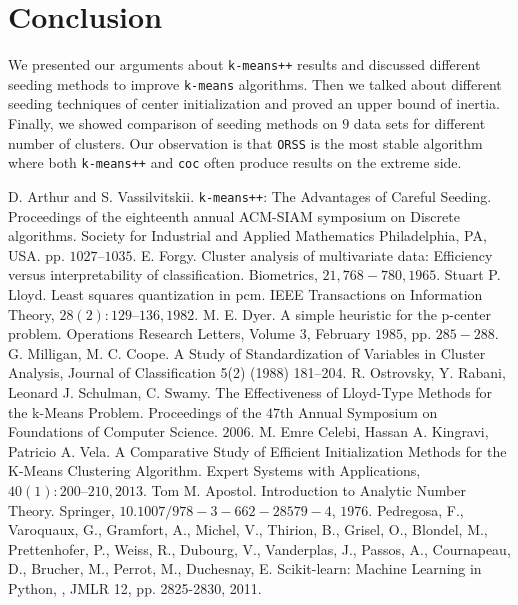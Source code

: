 \documentclass[twoside, 11pt]{article}
\begin{document}
	\section{Conclusion}
	We presented our arguments about \texttt{k-means++} results and discussed different seeding methods to improve \texttt{k-means} algorithms. Then we talked about different seeding techniques of center initialization and proved an upper bound of inertia. Finally, we showed comparison of seeding methods on $9$ data sets for different number of clusters. Our observation is that \texttt{ORSS} is the most stable algorithm where both \texttt{k-means++} and \texttt{coc} often produce results on the extreme side.
	\begin{thebibliography}{99}
		 D. Arthur and S. Vassilvitskii. \texttt{k-means++}: The Advantages of Careful Seeding. Proceedings of the eighteenth annual ACM-SIAM symposium on Discrete algorithms. Society for Industrial and Applied Mathematics Philadelphia, PA, USA. pp. $1027–1035$.
		 E. Forgy. Cluster analysis of multivariate data: Efficiency versus interpretability of classification. Biometrics, $21, 768-780, 1965$.
		 Stuart P. Lloyd. Least squares quantization in pcm. IEEE Transactions on Information Theory, $28(2):129–136, 1982$.
		 M. E. Dyer. A simple heuristic for the p-center problem. Operations Research Letters, Volume $3$, February $1985$, pp. $285-288$.
		 G. Milligan, M. C. Coope. A Study of Standardization of Variables in Cluster Analysis, Journal of Classification 5(2) (1988) 181–204.
		 R. Ostrovsky, Y. Rabani, Leonard J. Schulman, C. Swamy. The Effectiveness of Lloyd-Type Methods for the k-Means Problem. Proceedings of the $47$th Annual Symposium on Foundations of Computer Science. $2006$.
		 M. Emre Celebi, Hassan A. Kingravi, Patricio A. Vela. A Comparative Study of Efficient Initialization Methods for the K-Means Clustering Algorithm. Expert Systems with Applications, $40(1): 200–210, 2013$.
		 Tom M. Apostol. Introduction to Analytic Number Theory. Springer, $10.1007/978-3-662-28579-4$, $1976$.
		 Pedregosa, F., Varoquaux, G., Gramfort, A., Michel, V., Thirion, B., Grisel, O., Blondel, M., Prettenhofer, P., Weiss, R., Dubourg, V., Vanderplas, J., Passos, A., Cournapeau, D., Brucher, M., Perrot, M., Duchesnay, E. Scikit-learn: Machine Learning in Python, , JMLR 12, pp. 2825-2830, 2011.
	\end{thebibliography}
\end{document}

